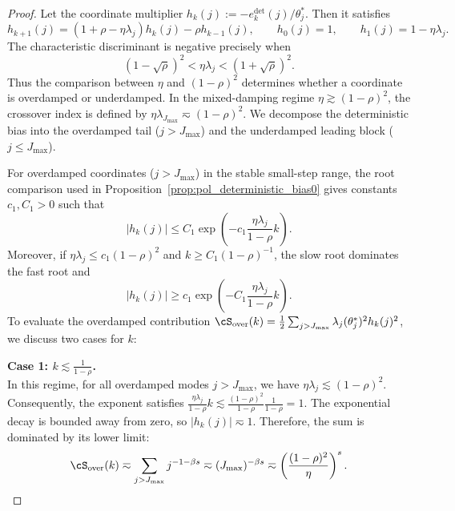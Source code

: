\documentclass[11pt]{article}
\begin{document}
\begin{proof}
Let the coordinate multiplier $h_k(j):= -e_k^{\mathrm{det}}(j)/\theta_j^*$. Then it satisfies
\[
    h_{k+1}(j)=(1+\rho-\eta\lambda_j)h_k(j)-\rho h_{k-1}(j),
    \qquad
    h_0(j)=1,
    \qquad
    h_1(j)=1-\eta\lambda_j.
\]
The characteristic discriminant is negative precisely when
\[
    (1-\sqrt\rho)^2<\eta\lambda_j<(1+\sqrt\rho)^2.
\]
Thus the comparison between $\eta$ and $(1-\rho)^2$ determines whether a coordinate is overdamped or underdamped. In the mixed-damping regime $\eta \gtrsim (1-\rho)^2$, the crossover index is defined by $\eta\lambda_{J_{\max}} \eqsim (1-\rho)^2$. We decompose the deterministic bias into the overdamped tail ($j > J_{\max}$) and the underdamped leading block ($j \le J_{\max}$).

For overdamped coordinates ($j > J_{\max}$) in the stable small-step range, the root comparison used in Proposition~\ref{prop:pol_deterministic_bias0} gives constants $c_1,C_1>0$ such that
\begin{equation}
\label{eq:pol_momentum_overdamped_multiplier_upper}
    |h_k(j)|
    \le
    C_1\exp\left(-c_1\frac{\eta\lambda_j}{1-\rho}k\right).
\end{equation}
Moreover, if $\eta\lambda_j\le c_1(1-\rho)^2$ and $k\ge C_1(1-\rho)^{-1}$, the slow root dominates the fast root and
\begin{equation*}
    |h_k(j)|
    \ge
    c_1\exp\left(-C_1\frac{\eta\lambda_j}{1-\rho}k\right).
\end{equation*}
To evaluate the overdamped contribution $\cS_{\mathrm{over}}(k) = \frac{1}{2} \sum_{j > J_{\max}} \lambda_j(\theta_j^*)^2 h_k(j)^2$, we discuss two cases for $k$:

\textbf{Case 1: $k \lesssim \frac{1}{1-\rho}$.} \\
In this regime, for all overdamped modes $j > J_{\max}$, we have $\eta\lambda_j \lesssim (1-\rho)^2$. 
Consequently, the exponent satisfies $\frac{\eta\lambda_j}{1-\rho}k \lesssim \frac{(1-\rho)^2}{1-\rho}\frac{1}{1-\rho} = 1$. The exponential decay is bounded away from zero, so $|h_k(j)| \eqsim 1$. Therefore, the sum is dominated by its lower limit:
\[
    \cS_{\mathrm{over}}(k) \eqsim \sum_{j > J_{\max}} j^{-1-\beta s} \eqsim (J_{\max})^{-\beta s} \eqsim \left(\frac{(1-\rho)^2}{\eta}\right)^s.
\]


\end{proof}
\end{document}
